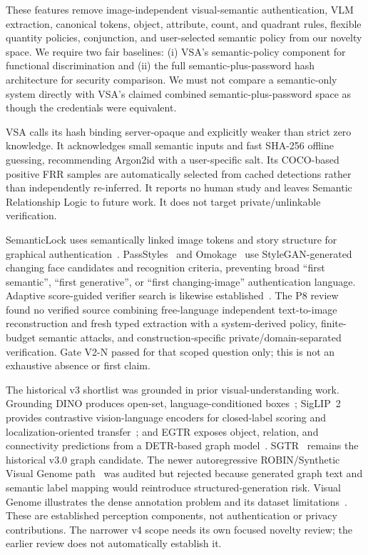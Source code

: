 \documentclass[compsoc,conference,a4paper,10pt,times]{IEEEtran}
\begin{document}
These features remove image-independent visual-semantic authentication, VLM extraction, canonical tokens, object, attribute, count, and quadrant rules, flexible quantity policies, conjunction, and user-selected semantic policy from our novelty space. We require two fair baselines: (i) VSA's semantic-policy component for functional discrimination and (ii) the full semantic-plus-password hash architecture for security comparison. We must not compare a semantic-only system directly with VSA's claimed combined semantic-plus-password space as though the credentials were equivalent.

VSA calls its hash binding server-opaque and explicitly weaker than strict zero knowledge. It acknowledges small semantic inputs and fast SHA-256 offline guessing, recommending Argon2id with a user-specific salt. Its COCO-based positive FRR samples are automatically selected from cached detections rather than independently re-inferred. It reports no human study and leaves Semantic Relationship Logic to future work. It does not target private/unlinkable verification.

SemanticLock uses semantically linked image tokens and story structure for graphical authentication~\cite{Olade2023SemanticLock}. PassStyles~\cite{Matsuzaki2025PassStyles} and Omokage~\cite{Matsuzaki2026Omokage} use StyleGAN-generated changing face candidates and recognition criteria, preventing broad ``first semantic'', ``first generative'', or ``first changing-image'' authentication language. Adaptive score-guided verifier search is likewise established~\cite{MartinezDiaz2011HillClimbing}. The P8 review found no verified source combining free-language independent text-to-image reconstruction and fresh typed extraction with a system-derived policy, finite-budget semantic attacks, and construction-specific private/domain-separated verification. Gate V2-N passed for that scoped question only; this is not an exhaustive absence or first claim.

The historical v3 shortlist was grounded in prior visual-understanding work. Grounding DINO produces open-set, language-conditioned boxes~\cite{Liu2024GroundingDINO}; SigLIP~2 provides contrastive vision-language encoders for closed-label scoring and localization-oriented transfer~\cite{Tschannen2025SigLIP2}; and EGTR exposes object, relation, and connectivity predictions from a DETR-based graph model~\cite{Im2024EGTR}. SGTR~\cite{Li2022SGTR} remains the historical v3.0 graph candidate. The newer autoregressive ROBIN/Synthetic Visual Genome path~\cite{Park2025SyntheticVG} was audited but rejected because generated graph text and semantic label mapping would reintroduce structured-generation risk. Visual Genome illustrates the dense annotation problem and its dataset limitations~\cite{Krishna2017VisualGenome}. These are established perception components, not authentication or privacy contributions. The narrower v4 scope needs its own focused novelty review; the earlier review does not automatically establish it.
\end{document}
